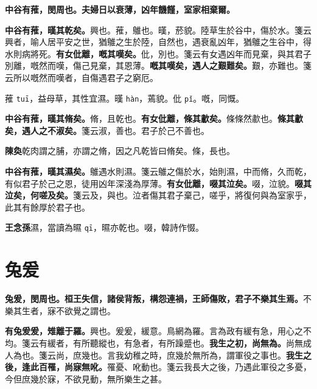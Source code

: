 
\textbf{中谷有蓷，閔周也。夫婦日以衰薄，凶年饑饉，室家相棄爾。}

\textbf{中谷有蓷，暵其乾矣。}{\footnotesize 興也。蓷，鵻也。暵，菸貌。陸草生於谷中，傷於水。箋云興者，喻人居平安之世，猶鵻之生於陸，自然也，遇衰亂凶年，猶鵻之生谷中，得水則病將死。}\textbf{有女仳離，嘅其嘆矣。}{\footnotesize 仳，別也。箋云有女遇凶年而見棄，與其君子別離，嘅然而嘆，傷己見棄，其恩薄。}\textbf{嘅其嘆矣，遇人之艱難矣。}{\footnotesize 艱，亦難也。箋云所以嘅然而嘆者，自傷遇君子之窮厄。}

\begin{quoting}蓷 \texttt{tuī}，益母草，其性宜濕。暵 \texttt{hàn}，蔫貌。仳 \texttt{pǐ}。嘅，同慨。\end{quoting}

\textbf{中谷有蓷，暵其脩矣。}{\footnotesize 脩，且乾也。}\textbf{有女仳離，條其歗矣。}{\footnotesize 條條然歗也。}\textbf{條其歗矣，遇人之不淑矣。}{\footnotesize 箋云淑，善也。君子於己不善也。}

\begin{quoting}\textbf{陳奐}乾肉謂之脯，亦謂之脩，因之凡乾皆曰脩矣。條，長也。\end{quoting}

\textbf{中谷有蓷，暵其濕矣。}{\footnotesize 鵻遇水則濕。箋云鵻之傷於水，始則濕，中而脩，久而乾，有似君子於己之恩，徒用凶年深淺為厚薄。}\textbf{有女仳離，啜其泣矣。}{\footnotesize 啜，泣貌。}\textbf{啜其泣矣，何嗟及矣。}{\footnotesize 箋云及，與也。泣者傷其君子棄己，嗟乎，將復何與為室家乎，此其有餘厚於君子也。}

\begin{quoting}\textbf{王念孫}濕，當讀為㬤 \texttt{qī}，㬤亦乾也。啜，韓詩作惙。\end{quoting}

\section{兔爰}


\textbf{兔爰，閔周也。桓王失信，諸侯背叛，構怨連禍，王師傷敗，君子不樂其生焉。}{\footnotesize 不樂其生者，寐不欲覺之謂也。}

\textbf{有兔爰爰，雉離于羅。}{\footnotesize 興也。爰爰，緩意。鳥網為羅。言為政有緩有急，用心之不均。箋云有緩者，有所聽縱也，有急者，有所躁蹙也。}\textbf{我生之初，尚無為。}{\footnotesize 尚無成人為也。箋云尚，庶幾也。言我幼稚之時，庶幾於無所為，謂軍役之事也。}\textbf{我生之後，逢此百罹，尚寐無吪。}{\footnotesize 罹憂、吪動也。箋云我長大之後，乃遇此軍役之多憂，今但庶幾於寐，不欲見動，無所樂生之甚。}

